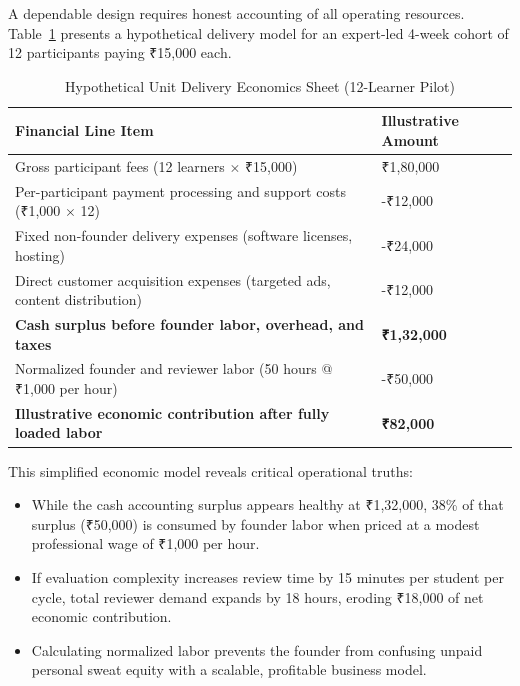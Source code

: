A dependable design requires honest accounting of all operating resources. Table~\ref{tab:delivery_economics_sheet} presents a hypothetical delivery model for an expert-led 4-week cohort of 12 participants paying ₹15,000 each.

\begin{table}[t]
\centering
\small
\caption{Hypothetical Unit Delivery Economics Sheet (12-Learner Pilot)}
\label{tab:delivery_economics_sheet}
\begin{tabularx}{0.75\textwidth}{>{\raggedright\arraybackslash}X >{\raggedleft\arraybackslash}p{}}
\toprule
Financial Line Item & Illustrative Amount \\
\midrule
Gross participant fees (12 learners $\times$ ₹15,000) & ₹1,80,000 \\
Per-participant payment processing and support costs (₹1,000 $\times$ 12) & -₹12,000 \\
Fixed non-founder delivery expenses (software licenses, hosting) & -₹24,000 \\
Direct customer acquisition expenses (targeted ads, content distribution) & -₹12,000 \\
\midrule
\textbf{Cash surplus before founder labor, overhead, and taxes} & \textbf{₹1,32,000} \\
\midrule
Normalized founder and reviewer labor (50 hours @ ₹1,000 per hour) & -₹50,000 \\
\midrule
\textbf{Illustrative economic contribution after fully loaded labor} & \textbf{₹82,000} \\
\bottomrule
\end{tabularx}
\end{table}

This simplified economic model reveals critical operational truths:
\begin{itemize}[leftmargin=*]
\item While the cash accounting surplus appears healthy at ₹1,32,000, 38\% of that surplus (₹50,000) is consumed by founder labor when priced at a modest professional wage of ₹1,000 per hour.
\item If evaluation complexity increases review time by 15 minutes per student per cycle, total reviewer demand expands by 18 hours, eroding ₹18,000 of net economic contribution.
\item Calculating normalized labor prevents the founder from confusing unpaid personal sweat equity with a scalable, profitable business model.
\end{itemize}

